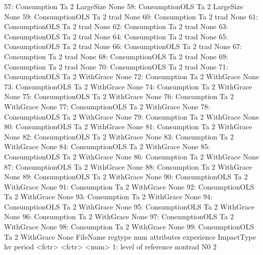 \begin{Schunk}
\begin{Soutput}
57:    Consumption      Ta     2  LargeSize       None
58: ConsumptionOLS      Ta     2  LargeSize       None
59: ConsumptionOLS      Ta     2       trad       None
60:    Consumption      Ta     2       trad       None
61: ConsumptionOLS      Ta     2       trad       None
62:    Consumption      Ta     2       trad       None
63: ConsumptionOLS      Ta     2       trad       None
64:    Consumption      Ta     2       trad       None
65: ConsumptionOLS      Ta     2       trad       None
66: ConsumptionOLS      Ta     2       trad       None
67:    Consumption      Ta     2       trad       None
68: ConsumptionOLS      Ta     2       trad       None
69:    Consumption      Ta     2       trad       None
70: ConsumptionOLS      Ta     2       trad       None
71: ConsumptionOLS      Ta     2  WithGrace       None
72:    Consumption      Ta     2  WithGrace       None
73: ConsumptionOLS      Ta     2  WithGrace       None
74:    Consumption      Ta     2  WithGrace       None
75: ConsumptionOLS      Ta     2  WithGrace       None
76:    Consumption      Ta     2  WithGrace       None
77: ConsumptionOLS      Ta     2  WithGrace       None
78: ConsumptionOLS      Ta     2  WithGrace       None
79:    Consumption      Ta     2  WithGrace       None
80: ConsumptionOLS      Ta     2  WithGrace       None
81:    Consumption      Ta     2  WithGrace       None
82: ConsumptionOLS      Ta     2  WithGrace       None
83:    Consumption      Ta     2  WithGrace       None
84: ConsumptionOLS      Ta     2  WithGrace       None
85: ConsumptionOLS      Ta     2  WithGrace       None
86:    Consumption      Ta     2  WithGrace       None
87: ConsumptionOLS      Ta     2  WithGrace       None
88:    Consumption      Ta     2  WithGrace       None
89: ConsumptionOLS      Ta     2  WithGrace       None
90: ConsumptionOLS      Ta     2  WithGrace       None
91:    Consumption      Ta     2  WithGrace       None
92: ConsumptionOLS      Ta     2  WithGrace       None
93:    Consumption      Ta     2  WithGrace       None
94: ConsumptionOLS      Ta     2  WithGrace       None
95: ConsumptionOLS      Ta     2  WithGrace       None
96:    Consumption      Ta     2  WithGrace       None
97: ConsumptionOLS      Ta     2  WithGrace       None
98:    Consumption      Ta     2  WithGrace       None
99: ConsumptionOLS      Ta     2  WithGrace       None
          FileName regtype   num attributes experience
                                      ImpactType             hv period
                                          <fctr>         <fctr>  <num>
 1:                   level of reference nontrad             N0      2

\end{Soutput}
\end{Schunk}
